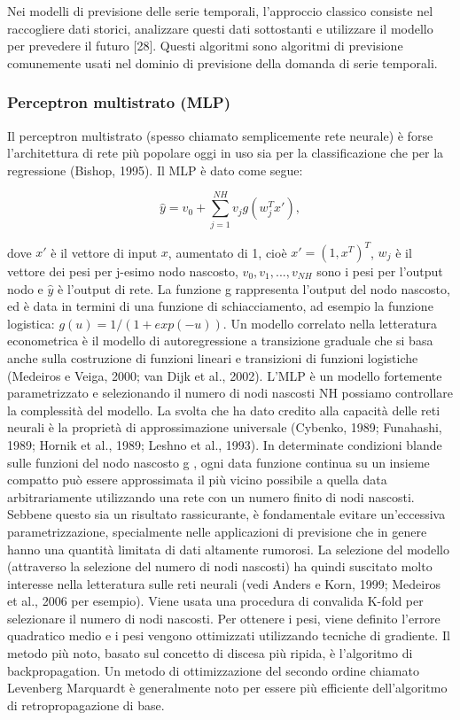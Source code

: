 \documentclass[12pt,a4paper]{report}
\begin{document}
Nei modelli di previsione delle serie temporali, l'approccio classico consiste nel raccogliere dati storici, analizzare questi dati sottostanti e utilizzare il modello per prevedere il futuro [28]. Questi algoritmi sono algoritmi di previsione comunemente usati nel dominio di previsione della domanda di serie temporali.

\subsubsection{Perceptron multistrato (MLP)}
Il perceptron multistrato (spesso chiamato semplicemente rete neurale) è forse l'architettura di rete più popolare oggi in uso sia per la classificazione che per la regressione (Bishop, 1995). Il MLP è dato come segue:

\begin{equation}
{\displaystyle \hat{y} = v_0 + \sum\limits_{j=1}^{NH} v_jg(w_{j}^{T}x')} ,
\end{equation}

dove $x'$ è il vettore di input $x$, aumentato di 1, cioè $ x' = (1, x^T )^T  $, $w_j$  è il vettore dei pesi per j-esimo nodo nascosto, $v_0, v_1, ..., v_{NH}$ sono i pesi per l'output nodo e $\hat{y}$ è l'output di rete. La funzione g rappresenta l'output del nodo nascosto, ed è data in termini di una funzione di schiacciamento, ad esempio la funzione logistica:
$g(u) = 1/(1 + exp(-u))$. 
Un modello correlato nella letteratura econometrica è il modello di autoregressione a transizione graduale che si basa anche sulla costruzione di funzioni lineari e transizioni di funzioni logistiche (Medeiros e Veiga, 2000; van Dijk et al., 2002).
L'MLP è un modello fortemente parametrizzato e selezionando il numero di nodi nascosti NH possiamo controllare la complessità del modello. La svolta che ha dato credito alla capacità delle reti neurali è la proprietà di approssimazione universale (Cybenko, 1989; Funahashi, 1989; Hornik et al., 1989; Leshno et al., 1993). In determinate condizioni blande sulle funzioni del nodo nascosto g , ogni data funzione continua su un insieme compatto può essere approssimata il più vicino possibile a quella data arbitrariamente utilizzando una rete con un numero finito di nodi nascosti. Sebbene questo sia un risultato rassicurante, è fondamentale evitare un'eccessiva parametrizzazione, specialmente nelle applicazioni di previsione che in genere hanno una quantità limitata di dati altamente rumorosi. La selezione del modello (attraverso la selezione del numero di nodi nascosti) ha quindi suscitato molto interesse nella letteratura sulle reti neurali (vedi Anders e Korn, 1999; Medeiros et al., 2006 per esempio). Viene usata una procedura di convalida K-fold per selezionare il numero di nodi nascosti.
Per ottenere i pesi, viene definito l'errore quadratico medio e i pesi vengono ottimizzati utilizzando tecniche di gradiente. Il metodo più noto, basato sul concetto di discesa più ripida, è l'algoritmo di backpropagation. Un metodo di ottimizzazione del secondo ordine chiamato Levenberg Marquardt è generalmente noto per essere più efficiente dell'algoritmo di retropropagazione di base.
\end{document}
